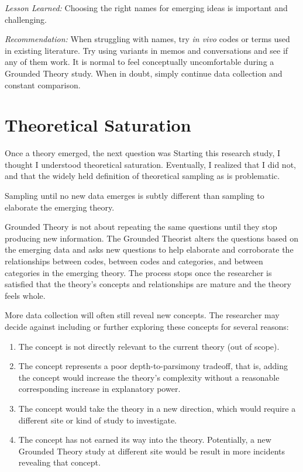 \textit{Lesson Learned:} Choosing the right names for emerging ideas is important and challenging.  

\textit{Recommendation:} When struggling with names, try \textit{in vivo} codes or terms used in existing literature. Try using variants in memos and conversations and see if any of them work. It is normal to feel conceptually uncomfortable during a Grounded Theory study. When in doubt, simply continue data collection and constant comparison.
\section{Theoretical Saturation}
\label{TheoreticalSaturation}
Once a theory emerged, the next question was  Starting this research study, I thought I understood theoretical saturation. Eventually, I realized that I did not, and that the widely held definition of theoretical sampling as  \cite{MorseTheoreticalSaturation} is problematic. 

Sampling until no new data emerges is subtly different than sampling to elaborate the emerging theory. 

Grounded Theory is not about repeating the same questions until they stop producing new information. The Grounded Theorist alters the questions based on the emerging data and asks new questions to help elaborate and corroborate the relationships between codes, between codes and categories, and between categories in the emerging theory. The process stops once the researcher is satisfied that the theory's concepts and relationships are mature and the theory feels whole. 

More data collection will often still reveal new concepts. The researcher may decide against including or further exploring these concepts for several reasons:
\begin{enumerate}
  \item The concept is not directly relevant to the current theory (out of scope).
  \item The concept represents a poor depth-to-parsimony tradeoff, that is, adding the concept would increase the theory's complexity without a reasonable corresponding increase in explanatory power. 
  \item The concept would take the theory in a new direction, which would require a different site or kind of study to investigate. 
  \item The concept has not earned its way into the theory. Potentially, a new Grounded Theory study at different site would be result in more incidents revealing that concept. 
\end{enumerate}

